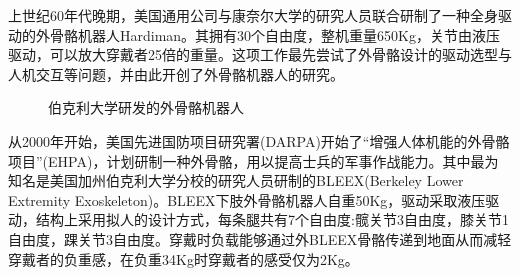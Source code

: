 上世纪60年代晚期，美国通用公司与康奈尔大学的研究人员联合研制了一种全身驱动的外骨骼机器人Hardiman\cite{p6}。其拥有30个自由度，整机重量650Kg，关节由液压驱动，可以放大穿戴者25倍的重量。这项工作最先尝试了外骨骼设计的驱动选型与人机交互等问题，并由此开创了外骨骼机器人的研究。
\begin{figure}[htb]
    \quad
    \caption{伯克利大学研发的外骨骼机器人}
    \label{fig:subfigss}
\end{figure}

从2000年开始，美国先进国防项目研究署(DARPA)开始了“增强人体机能的外骨骼项目”(EHPA)，计划研制一种外骨骼，用以提高士兵的军事作战能力。其中最为知名是美国加州伯克利大学分校的研究人员研制的BLEEX\cite{p5,p7}(Berkeley Lower Extremity Exoskeleton)。BLEEX下肢外骨骼机器人自重50Kg，驱动采取液压驱动，结构上采用拟人的设计方式，每条腿共有7个自由度:髋关节3自由度，膝关节1自由度，踝关节3自由度。穿戴时负载能够通过外BLEEX骨骼传递到地面从而减轻穿戴者的负重感，在负重34Kg时穿戴者的感受仅为2Kg。

